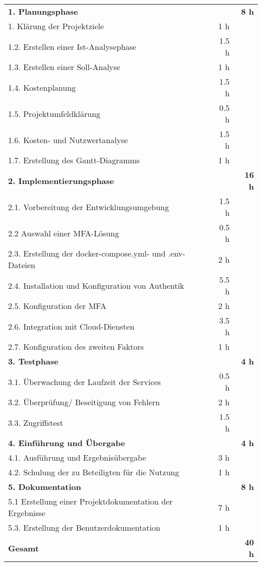 \begin{tabularx}{\textwidth}{Xrrr}
\rowcolor{heading}\textbf{1. Planungsphase} & \textbf{} & \textbf{} & \textbf{8 h} \\
1. Klärung der Projektziele &       &   1 h   &  \\
\rowcolor{odd}1.2. Erstellen einer Ist-Analysephase &       &    1.5 h   &  \\
1.3. Erstellen einer Soll-Analyse &       &    1 h    &  \\
\rowcolor{odd}1.4. Kostenplanung &       &   1.5 h   &  \\
1.5. Projektumfeldklärung &       &    0.5 h   &  \\
\rowcolor{odd}1.6. Kosten- und Nutzwertanalyse &       &    1.5 h   &  \\
1.7. Erstellung des Gantt-Diagramms &        &    1 h     &   \\
\rowcolor{heading}\textbf{2. Implementierungsphase} & \textbf{} & \textbf{} & \textbf{16 h} \\
2.1. Vorbereitung der Entwicklungsumgebung &       &    1.5 h   &  \\
\rowcolor{odd}2.2 Auswahl einer \acs{MFA}-Lösung  &       &    0.5 h   &  \\
2.3. Erstellung der docker-compose.yml- und .env-Dateien &       &   2 h    &  \\
\rowcolor{odd}2.4. Installation und Konfiguration von Authentik &      &   5.5 h    &  \\
2.5. Konfiguration der \acs{MFA} &       &   2 h   &  \\
\rowcolor{odd}2.6. Integration mit Cloud-Diensten &     &   3.5 h    &  \\
2.7. Konfiguration des zweiten Faktors &       &    1 h    &   \\
\rowcolor{heading}\textbf{3. Testphase} & \textbf{} & \textbf{} & \textbf{4 h} \\
3.1. Überwachung der Laufzeit der Services &       &    0.5 h    &  \\
\rowcolor{odd}3.2. Überprüfung/ Beseitigung von Fehlern &       &    2 h   &  \\
3.3. Zugriffstest &        &    1.5 h   &    \\
\rowcolor{heading}\textbf{4. Einführung und Übergabe} & \textbf{} & \textbf{} & \textbf{4 h} \\
4.1. Ausführung und Ergebnisübergabe &       &    3 h   &  \\
\rowcolor{odd}4.2. Schulung der zu Beteiligten für die Nutzung &      &   1 h   &    \\
\rowcolor{heading}\textbf{5. Dokumentation} & \textbf{} & \textbf{} & \textbf{8 h} \\
5.1 Erstellung einer Projektdokumentation der Ergebnisse &       &   7 h   &  \\
\rowcolor{odd}5.3. Erstellung der Benutzerdokumentation &       &    1 h   &    \\
\hline
\hline
\rowcolor{heading}\textbf{Gesamt} & \textbf{} & \textbf{} & \textbf{40 h} \\
\end{tabularx}
